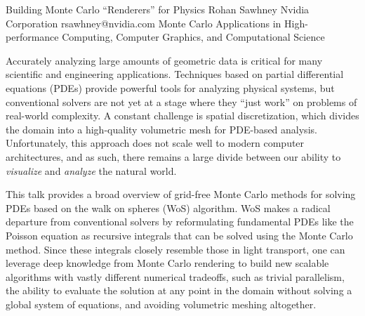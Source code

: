 \begin{talk}
  {Building Monte Carlo ``Renderers'' for Physics}%
  {Rohan Sawhney}%
  {Nvidia Corporation}%
  {rsawhney@nvidia.com}%
  {}%
  {Monte Carlo Applications in High-performance Computing, Computer Graphics, and Computational Science}%
    
   
Accurately analyzing large amounts of geometric data is critical for many scientific and engineering applications. Techniques based on partial differential equations (PDEs) provide powerful tools for analyzing physical systems, but conventional solvers are not yet at a stage where they “just work” on problems of real-world complexity. A constant challenge is spatial discretization, which divides the domain into a high-quality volumetric mesh for PDE-based analysis. Unfortunately, this approach does not scale well to modern computer architectures, and as such, there remains a large divide between our ability to \emph{visualize} and \emph{analyze} the natural world.

This talk provides a broad overview of grid-free Monte Carlo methods for solving PDEs based on the walk on spheres (WoS) algorithm. WoS makes a radical departure from conventional solvers by reformulating fundamental PDEs like the Poisson equation as recursive integrals that can be solved using the Monte Carlo method. Since these integrals closely resemble those in light transport, one can leverage deep knowledge from Monte Carlo rendering to build new scalable algorithms with vastly different numerical tradeoffs, such as trivial parallelism, the ability to
evaluate the solution at any point in the domain without solving a global system
of equations, and avoiding volumetric meshing altogether.



\end{talk}

